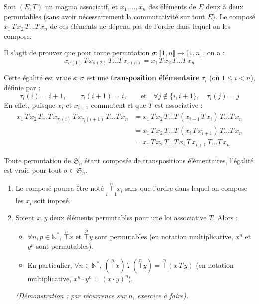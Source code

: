 \documentclass[a4paper,11pt]{article}
\newcommand{\N}{\mathbb{N}}
\newcommand{\intEnt}[2]{\llbracket #1, #2 \rrbracket}
\newcommand{\mot}[1]{\textcolor{bordeaux}{\textbf{#1}}}
\begin{document}
\begin{proposition}
Soit $(E, T)$ un magma associatif, et $x_1, \dots, x_n$ des éléments de $E$ deux à deux permutables (sans avoir nécessairement la commutativité sur tout $E$). Le composé $x_1 \, T \, x_2 \, T \dots T \, x_n$ de ces éléments ne dépend pas de l'ordre dans lequel on les compose.
\end{proposition}

\begin{demonstration}
Il s'agit de prouver que pour toute permutation $\sigma : \intEnt{1}{n} \to \intEnt{1}{n}$, on a :
\[
x_{\sigma(1)} \, T \, x_{\sigma(2)} \, T \dots T \, x_{\sigma(n)} = x_1 \, T \, x_2 \, T \dots T \, x_n
\]

Cette égalité est vraie si $\sigma$ est une \mot{transposition élémentaire} $\tau_i$ (où $1 \le i < n$), définie par :
\[
\tau_i(i) = i+1, \qquad \tau_i(i+1) = i, \qquad \text{et} \quad \forall j \notin \{i, i+1\}, \quad \tau_i(j) = j
\]
En effet, puisque $x_i$ et $x_{i+1}$ commutent et que $T$ est associative :
\begin{align*}
    x_1 \, T \, x_2 \, T \dots T \, x_{\tau_i(i)} \, T \, x_{\tau_i(i+1)} \, T \dots T \, x_n 
    &= x_1 \, T \, x_2 \, T \dots T \, (x_{i+1} \, T \, x_i) \, T \dots T \, x_n \\
    &= x_1 \, T \, x_2 \, T \dots T \, (x_i \, T \, x_{i+1}) \, T \dots T \, x_n \\
    &= x_1 \, T \, x_2 \, T \dots T \, x_i \, T \, x_{i+1} \, T \dots T \, x_n
\end{align*}

Toute permutation de $\mathfrak{S}_n$ étant composée de transpositions élémentaires, l'égalité est vraie pour tout $\sigma \in \mathfrak{S}_n$.
\end{demonstration}

\begin{remarque}[Conséquences]
\begin{enumerate}
    \item Le composé pourra être noté $\displaystyle\underset{i=1}{\overset{n}{\top}} x_i$ sans que l'ordre dans lequel on compose les $x_i$ soit imposé.
    \item Soient $x, y$ deux éléments permutables pour une loi associative $T$. Alors :
    \begin{itemize}
        \item $\forall n, p \in \N^*$, $\overset{n}{\top} x$ et $\overset{p}{\top} y$ sont permutables (en notation multiplicative, $x^n$ et $y^p$ sont permutables).
        \item En particulier, $\forall n \in \N^*$, $(\overset{n}{\top} x) \, T \, (\overset{n}{\top} y) = \overset{n}{\top} (x \, T \, y)$ (en notation multiplicative, $x^n \cdot y^n = (x \cdot y)^n$).
    \end{itemize}
    \textit{(Démonstration : par récurrence sur $n$, exercice à faire).}
\end{enumerate}
\end{remarque}
\end{document}
